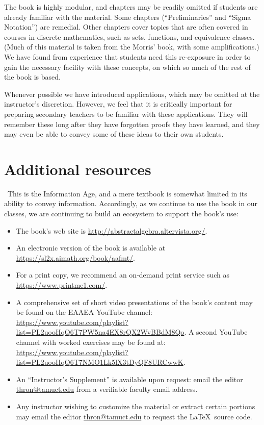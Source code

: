 The book is highly modular, and chapters may be readily omitted if students are already familiar with the material. Some chapters  (``Preliminaries'' and ``Sigma Notation'') are remedial. Other chapters cover topics that are often covered in courses in discrete mathematics, such as sets, functions, and equivalence classes. (Much of this material is taken from the Morris' book, with some amplifications.) We have found from experience that students need this re-exposure in order to gain the necessary facility with these concepts, on which so much of the rest of the book is based.

Whenever possible we have introduced applications, which may be omitted at the instructor's discretion. However, we feel that it is critically important for preparing secondary teachers to be familiar with these applications. They will remember these long after they have forgotten proofs they have learned, and they may even be able to convey some of these ideas to their own students. 



\section*{Additional resources}
\
This is the Information Age, and a mere textbook is somewhat limited in its ability to convey information.  Accordingly, as we continue to use the book in our classes, we are continuing to build an ecosystem  to support the book's use:
\begin{itemize}
\item
The book's web site is \url{http://abstractalgebra.altervista.org/}.
\item
An electronic version of the book is available at \url{https://sl2x.aimath.org/book/aafmt/}.
\item
For a print copy, we recommend an on-demand print service such as \url{https://www.printme1.com/}.
\item
 A comprehensive set of short video presentations of the book's content may be found on the EAAEA YouTube channel: \url{https://www.youtube.com/playlist?list=PL2uooHqQ6T7PW5na4EX8rQX2WvBBdM8Qo}. A second YouTube channel with worked exercises may be found at: \url{https://www.youtube.com/playlist?list=PL2uooHqQ6T7NMO1Lk5lX3tDyQF8URCwwK}. 
\item
An ``Instructor's Supplement'' is available upon request: email the editor \href{mailto:thron@tamuct.edu}{thron@tamuct.edu} from a verifiable faculty email address.
\item
Any instructor wishing to customize the material or extract certain portions may email the editor \href{mailto:thron@tamuct.edu}{thron@tamuct.edu}  to request the \LaTeX~source code. 
\end{itemize}


